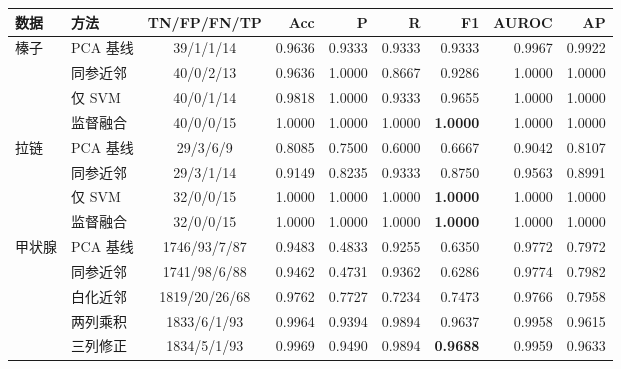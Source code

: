 \begin{tabular}{@{}llcrrrrrr@{}}
\toprule
数据 & 方法 & TN/FP/FN/TP & Acc & P & R & F1 & AUROC & AP \\
\midrule
榛子 & PCA 基线 & 39/1/1/14 & 0.9636 & 0.9333 & 0.9333 & 0.9333 & 0.9967 & 0.9922 \\
 & 同参近邻 & 40/0/2/13 & 0.9636 & 1.0000 & 0.8667 & 0.9286 & 1.0000 & 1.0000 \\
 & 仅 SVM & 40/0/1/14 & 0.9818 & 1.0000 & 0.9333 & 0.9655 & 1.0000 & 1.0000 \\
 & 监督融合 & 40/0/0/15 & 1.0000 & 1.0000 & 1.0000 & \textbf{1.0000} & 1.0000 & 1.0000 \\
\cmidrule(lr){1-9}
拉链 & PCA 基线 & 29/3/6/9 & 0.8085 & 0.7500 & 0.6000 & 0.6667 & 0.9042 & 0.8107 \\
 & 同参近邻 & 29/3/1/14 & 0.9149 & 0.8235 & 0.9333 & 0.8750 & 0.9563 & 0.8991 \\
 & 仅 SVM & 32/0/0/15 & 1.0000 & 1.0000 & 1.0000 & \textbf{1.0000} & 1.0000 & 1.0000 \\
 & 监督融合 & 32/0/0/15 & 1.0000 & 1.0000 & 1.0000 & \textbf{1.0000} & 1.0000 & 1.0000 \\
\cmidrule(lr){1-9}
甲状腺 & PCA 基线 & 1746/93/7/87 & 0.9483 & 0.4833 & 0.9255 & 0.6350 & 0.9772 & 0.7972 \\
 & 同参近邻 & 1741/98/6/88 & 0.9462 & 0.4731 & 0.9362 & 0.6286 & 0.9774 & 0.7982 \\
 & 白化近邻 & 1819/20/26/68 & 0.9762 & 0.7727 & 0.7234 & 0.7473 & 0.9766 & 0.7958 \\
 & 两列乘积 & 1833/6/1/93 & 0.9964 & 0.9394 & 0.9894 & 0.9637 & 0.9958 & 0.9615 \\
 & 三列修正 & 1834/5/1/93 & 0.9969 & 0.9490 & 0.9894 & \textbf{0.9688} & 0.9959 & 0.9633 \\
\bottomrule
\end{tabular}
